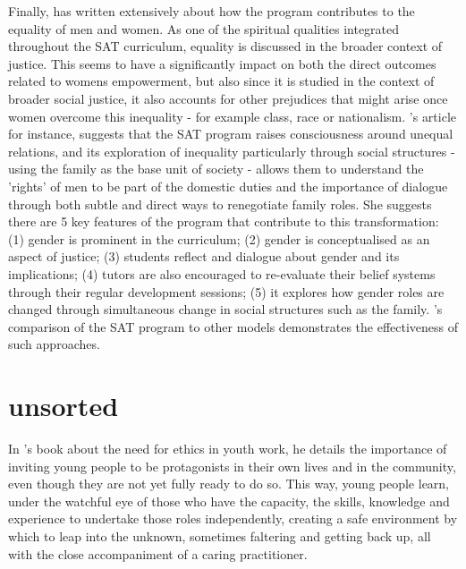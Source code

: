 Finally, \citet{Murphy-Graham2008,Murphy-Graham2009,Murphy-Graham2010,Murphy-Graham2012} has written extensively about how the program contributes to the equality of men and women. As one of the spiritual qualities integrated throughout the SAT curriculum, equality is discussed in the broader context of justice. This seems to have a significantly impact on both the direct outcomes related to womens empowerment, but also since it is studied in the context of broader social justice, it also accounts for other prejudices that might arise once women overcome this inequality - for example class, race or nationalism. \citeauthor{Murphy-Graham2009}'s \citeyear{Murphy-Graham2009} article for instance, suggests that the SAT program raises consciousness around unequal relations, and its exploration of inequality particularly through social structures - using the family as the base unit of society - allows them to understand the 'rights' of men to be part of the domestic duties and the importance of dialogue through both subtle and direct ways to renegotiate family roles. She suggests there are 5 key features of the program that contribute to this transformation: (1) gender is prominent in the curriculum; (2) gender is conceptualised as an aspect of justice; (3) students reflect and dialogue about gender and its implications; (4) tutors are also encouraged to re-evaluate their belief systems through their regular development sessions; (5) it explores how gender roles are changed through simultaneous change in social structures such as the family. \citet{Murphy-Graham2009}'s comparison of the SAT program to other models demonstrates the effectiveness of such approaches. 


 
 
 
\section{unsorted}
  
In \citet{Sercombe2010}'s book about the need for ethics in youth work, he details the importance of inviting young people to be protagonists in their own lives and in the community, even though they are not yet fully ready to do so. This way, young people learn, under the watchful eye of those who have the capacity, the skills, knowledge and experience to undertake those roles independently, creating a safe environment by which to leap into the unknown, sometimes faltering and getting back up, all with the close accompaniment of a caring practitioner.


